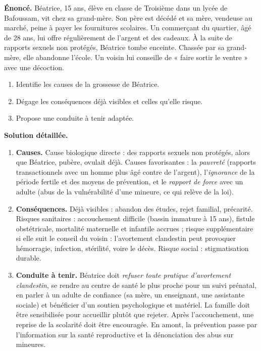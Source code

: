 \documentclass[11pt]{article}
\begin{document}
\begin{exoresolu}
\textbf{Énoncé.} Béatrice, 15 ans, élève en classe de Troisième dans un lycée de Bafoussam, vit chez sa grand-mère. Son père est décédé et sa mère, vendeuse au marché, peine à payer les fournitures scolaires. Un commerçant du quartier, âgé de 28 ans, lui offre régulièrement de l'argent et des cadeaux. À la suite de rapports sexuels non protégés, Béatrice tombe enceinte. Chassée par sa grand-mère, elle abandonne l'école. Un voisin lui conseille de « faire sortir le ventre » avec une décoction.
\begin{enumerate}
\item Identifie les causes de la grossesse de Béatrice.
\item Dégage les conséquences déjà visibles et celles qu'elle risque.
\item Propose une conduite à tenir adaptée.
\end{enumerate}
\tcblower
\textbf{Solution détaillée.}
\begin{enumerate}
\item \textbf{Causes.} Cause biologique directe : des rapports sexuels non protégés, alors que Béatrice, pubère, ovulait déjà. Causes favorisantes : la \emph{pauvreté} (rapports transactionnels avec un homme plus âgé contre de l'argent), l'\emph{ignorance} de la période fertile et des moyens de prévention, et le \emph{rapport de force} avec un adulte (abus de la vulnérabilité d'une mineure, ce qui relève de la loi).
\item \textbf{Conséquences.} Déjà visibles : abandon des études, rejet familial, précarité. Risques sanitaires : accouchement difficile (bassin immature à 15 ans), fistule obstétricale, mortalité maternelle et infantile accrues ; risque supplémentaire si elle suit le conseil du voisin : l'avortement clandestin peut provoquer hémorragie, infection, stérilité, voire le décès. Risque social : stigmatisation durable.
\item \textbf{Conduite à tenir.} Béatrice doit \emph{refuser toute pratique d'avortement clandestin}, se rendre au centre de santé le plus proche pour un suivi prénatal, en parler à un adulte de confiance (sa mère, un enseignant, une assistante sociale) et bénéficier d'un soutien psychologique et matériel. La famille doit être sensibilisée pour accueillir plutôt que rejeter. Après l'accouchement, une reprise de la scolarité doit être encouragée. En amont, la prévention passe par l'information sur la santé reproductive et la dénonciation des abus sur mineures.
\end{enumerate}
\end{exoresolu}
\end{document}
